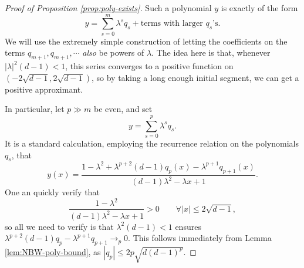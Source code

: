 \begin{proof}[Proof of Proposition \ref{prop:poly-exists}]
    Such a polynomial $y$ is exactly of the form
    $$
        y = \sum_{s = 0}^m \lambda^s q_s + \text{terms with larger $q_s$'s}.
    $$
    We will use the extremely simple construction of letting the coefficients on the terms $q_{m+1},q_{m+1}, \cdots$ \emph{also} be powers of $\lambda$. The idea here is that, whenever $|\lambda|^2(d-1) < 1$, this series converges to a positive function on $(-2\sqrt{d-1},2\sqrt{d-1})$, so by taking a long enough initial segment, we can get a positive approximant. 

    In particular, let $p \gg m$ be even, and set
    $$
        y = \sum_{s = 0}^p \lambda^s q_s.
    $$
    It is a standard calculation, employing the recurrence relation on the polynomials $q_s$, that
    $$
        y(x) = \frac{1 - \lambda^2 + \lambda^{p+2}(d-1)q_p(x) - \lambda^{p+1}q_{p+1}(x)}{(d-1)\lambda^2 - \lambda x + 1}.
    $$
    One an quickly verify that
    $$
        \frac{1 - \lambda^2}{(d-1)\lambda^2 - \lambda x + 1} > 0 \qquad \forall |x| \le 2\sqrt{d-1},
    $$
    so all we need to verify is that $\lambda^2(d-1) < 1$ ensures $\lambda^{p+2}(d-1)q_p - \lambda^{p+1}q_{p+1} \to_p 0$. This follows immediately from Lemma \ref{lem:NBW-poly-bound}, as $|q_p| \le 2p\sqrt{d(d-1)^p}$.
\end{proof}

